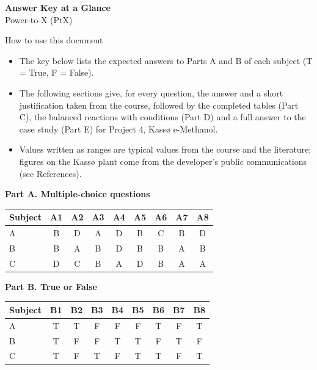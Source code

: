 \documentclass[11pt,a4paper]{article}
\begin{document}
\begin{center}
{\LARGE\bfseries Answer Key at a Glance}\\[3pt]
{\large Power-to-X (PtX)}
\end{center}

\begin{keybox}{How to use this document}
\begin{itemize}
  \item The key below lists the expected answers to Parts A and B of each subject (T = True, F = False).
  \item The following sections give, for every question, the answer and a short justification taken from
        the course, followed by the completed tables (Part C), the balanced reactions with conditions
        (Part D) and a full answer to the case study (Part E) for Project 4, Kassø e-Methanol.
  \item Values written as ranges are typical values from the course and the literature; figures on the Kassø
        plant come from the developer's public communications (see References).
\end{itemize}
\end{keybox}

\medskip
\textbf{Part A. Multiple-choice questions}\par
\smallskip
{\centering
\renewcommand{\arraystretch}{1.3}
\begin{tabular}{l*{8}{c}}
\toprule
\textbf{Subject} & \textbf{A1} & \textbf{A2} & \textbf{A3} & \textbf{A4} & \textbf{A5} & \textbf{A6} & \textbf{A7} & \textbf{A8}\\
\midrule
A & B & D & A & D & B & C & B & D\\
B & B & A & B & D & B & B & A & B\\
C & D & C & B & A & D & B & A & A\\
\bottomrule
\end{tabular}\par}

\medskip
\textbf{Part B. True or False}\par
\smallskip
{\centering
\renewcommand{\arraystretch}{1.3}
\begin{tabular}{l*{8}{c}}
\toprule
\textbf{Subject} & \textbf{B1} & \textbf{B2} & \textbf{B3} & \textbf{B4} & \textbf{B5} & \textbf{B6} & \textbf{B7} & \textbf{B8}\\
\midrule
A & T & T & F & F & F & T & F & T\\
B & T & F & F & T & T & F & T & F\\
C & T & F & T & F & T & T & F & T\\
\bottomrule
\end{tabular}\par}
\end{document}
